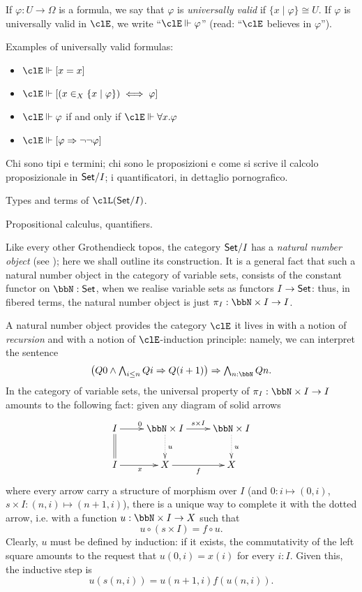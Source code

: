 If $\varphi : U\to\Omega$ is a formula, we say that $\varphi$ is \emph{universally valid} if $\{x\mid\varphi\}\cong U$. If $\varphi$ is universally valid in $\clE$, we write ``$\clE\Vdash \varphi$'' (read: ``$\clE$ believes in $\varphi$'').

Examples of universally valid formulas:
\begin{itemize}
	\item $\clE\Vdash [x=x]$
	\item $\clE\Vdash [(x \in_X \{x\mid\varphi\}) \iff \varphi]$
	\item $\clE\Vdash \varphi$ if and only if $\clE \Vdash \forall x.\varphi$
	\item $\clE\Vdash [\varphi \Rightarrow \lnot\lnot\varphi]$
\end{itemize}
Chi sono tipi e termini; chi sono le proposizioni e come si scrive il calcolo proposizionale in $\mathsf{Set}/I$; i quantificatori, in dettaglio pornografico.
\begin{definition}
	Types and terms of $\clL(\Set/I)$.
\end{definition}
\begin{definition}
	Propositional calculus, quantifiers.
\end{definition}
\begin{remark}
	Like every other Grothendieck topos, the category $\mathsf{Set}/I$ has a \emph{natural number object} (see \cite[??]{mac1992sheaves}); here we shall outline its construction. It is a general fact that such a natural number object in the category of variable sets, consists of the constant functor on $\bbN : \Set$, when we realise variable sets as functors $I \to \mathsf{Set}$: thus, in fibered terms, the natural number object is just $\pi_I : \bbN \times I \to I$.

	A natural number object provides the category $\clE$ it lives in with a notion of \emph{recursion} and with a notion of $\clE$-induction principle: namely, we can interpret the sentence
	\[\textstyle\big(Q0\land \bigwedge_{i\le n} Qi\Rightarrow Q(i+1)\big)\Rightarrow \bigwedge_{n : \bbN} Qn.\]
	In the category of variable sets, the universal property of $\pi_I : \bbN\times I \to I$ amounts to the following fact: given any diagram of solid arrows 
	\[
	\xymatrix{
		I \ar[r]^0 \ar@{=}[d] & \bbN\times I\ar@{.>}[d]^u \ar[r]^{s\times I} & \bbN \times I\ar@{.>}[d]^u \\ 
		I \ar[r]_x & X \ar[r]_f & X
	}	
	\]
	where every arrow carry a structure of morphism over $I$ (and $0 : i \mapsto (0,i)$, $s\times I : (n,i) \mapsto (n+1,i)$), there is a unique way to complete it with the dotted arrow, i.e. with a function $u : \bbN \times I \to X$ such that 
	\[u \circ (s\times I) = f \circ u.\]
	Clearly, $u$ must be defined by induction: if it exists, the commutativity of the left square amounts to the request that $u(0,i)=x(i)$ for every $i : I$. Given this, the inductive step is 
	\[u(s(n,i)) = u(n+1,i) f(u(n,i)).\]
\end{remark}
